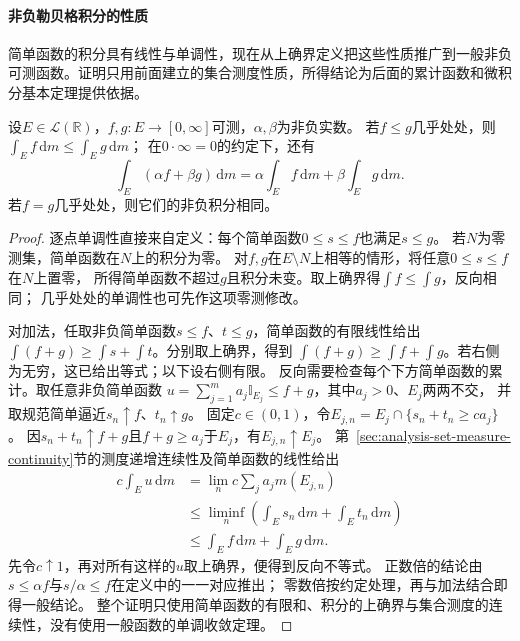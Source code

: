 \paragraph{非负勒贝格积分的性质}
简单函数的积分具有线性与单调性，现在从上确界定义把这些性质推广到一般非负可测函数。证明只用前面建立的集合测度性质，所得结论为后面的累计函数和微积分基本定理提供依据。
\begin{theorem}[非负勒贝格积分的线性与单调性]
\label{lem:analysis-nonnegative-integral-properties}
设$E\in\mathcal L(\mathbb R)$，$f,g:E\to[0,\infty]$可测，$\alpha,\beta$为非负实数。
若$f\leq g$几乎处处，则$\int_Ef\,\mathrm dm\leq\int_Eg\,\mathrm dm$；
在$0\cdot\infty=0$的约定下，还有
\[
 \int_E(\alpha f+\beta g)\,\mathrm dm
 =\alpha\int_Ef\,\mathrm dm+\beta\int_Eg\,\mathrm dm.
\]
若$f=g$几乎处处，则它们的非负积分相同。
\end{theorem}
\begin{proof}
逐点单调性直接来自定义：每个简单函数$0\leq s\leq f$也满足$s\leq g$。
若$N$为零测集，简单函数在$N$上的积分为零。
对$f,g$在$E\setminus N$上相等的情形，将任意$0\leq s\leq f$在$N$上置零，
所得简单函数不超过$g$且积分未变。取上确界得$\int f\leq\int g$，反向相同；
几乎处处的单调性也可先作这项零测修改。

对加法，任取非负简单函数$s\leq f$、$t\leq g$，简单函数的有限线性给出
$\int(f+g)\geq\int s+\int t$。分别取上确界，得到
$\int(f+g)\geq\int f+\int g$。若右侧为无穷，这已给出等式；以下设右侧有限。
反向需要检查每个下方简单函数的累计。取任意非负简单函数
$u=\sum_{j=1}^m a_j\mathbb I_{E_j}\leq f+g$，其中$a_j>0$、$E_j$两两不交，
并取规范简单逼近$s_n\uparrow f$、$t_n\uparrow g$。
固定$c\in(0,1)$，令$E_{j,n}=E_j\cap\{s_n+t_n\geq ca_j\}$。
因$s_n+t_n\uparrow f+g$且$f+g\geq a_j$于$E_j$，有$E_{j,n}\uparrow E_j$。
第~\ref{sec:analysis-set-measure-continuity}节的测度递增连续性及简单函数的线性给出
\[
 \begin{aligned}
 c\int_Eu\,\mathrm dm
 &=\lim_n c\sum_j a_jm(E_{j,n})\\
 &\leq\liminf_n\left(\int_Es_n\,\mathrm dm+\int_Et_n\,\mathrm dm\right)\\
 &\leq\int_Ef\,\mathrm dm+\int_Eg\,\mathrm dm.
 \end{aligned}
\]
先令$c\uparrow1$，再对所有这样的$u$取上确界，便得到反向不等式。
正数倍的结论由$s\leq\alpha f$与$s/\alpha\leq f$在定义中的一一对应推出；
零数倍按约定处理，再与加法结合即得一般结论。
整个证明只使用简单函数的有限和、积分的上确界与集合测度的连续性，没有使用一般函数的单调收敛定理。
\end{proof}

